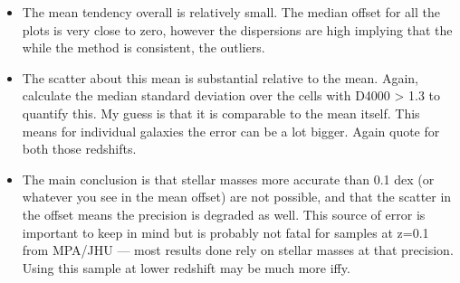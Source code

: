 \begin{itemize}
\item{The mean tendency overall is relatively small. The median offset for all the plots is very close to zero, however the dispersions are high implying that the while the \citet{kauffmann_stellar_2003} method is consistent, the outliers.}
\item{The scatter about this mean is substantial relative to the mean. Again, calculate the median standard deviation over the cells with D4000 > 1.3 to quantify this. My guess is that it is  comparable to the mean itself. This means for individual galaxies the error can be a lot bigger. Again quote for both those redshifts.}
\item{The main conclusion is that stellar masses more accurate than 0.1 dex (or whatever you see in the mean offset) are not possible, and that the scatter in the offset means the precision is degraded as well. This source of error is important to keep in mind but is probably not fatal for samples at z=0.1 from MPA/JHU --- most results done rely on stellar masses at that precision. Using this sample at lower redshift may be much more iffy.}
\end{itemize}










